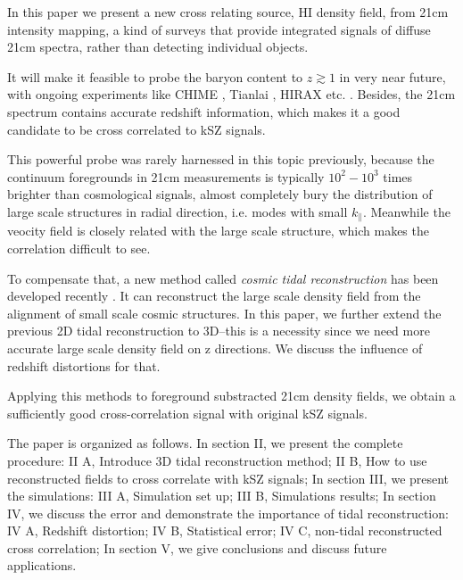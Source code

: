 In this paper we present a new cross relating source, HI density field, from 21cm intensity mapping, 
a kind of surveys that provide integrated signals of diffuse 21cm spectra, 
rather than detecting individual objects. 

It will make it feasible to probe the baryon content to $z\gtrsim1$ in very near future, with ongoing experiments like
CHIME \cite{2014SPIE.9145E..22B}, Tianlai \cite{2015ApJ...798...40X}, 
HIRAX \cite{HIRAX} etc.
.
Besides, the 21cm spectrum contains accurate redshift information, which makes it a good candidate to be cross correlated to kSZ signals.

This powerful probe was rarely harnessed in this topic previously, 
because the continuum foregrounds in 21cm measurements is typically $10^2 - 10^3$ times brighter than cosmological signals, almost completely bury the distribution of large scale structures in radial direction, i.e. modes with small $k_\parallel$.
Meanwhile the veocity field is closely related with the large scale structure, 
which makes the correlation difficult to see.

To compensate that, a new method called {\it cosmic tidal reconstruction} has been 
developed recently \cite{2012:pen}\cite{2015:zhu}. 
It can reconstruct the large scale density field from the alignment of small 
scale cosmic structures. 
In this paper, we further extend the previous 2D tidal reconstruction to 3D--this is a necessity since we need more accurate large scale density field on z directions. We discuss the influence of redshift distortions for that.

Applying this methods to foreground substracted 21cm density fields, we obtain a sufficiently good cross-correlation signal with original kSZ signals. 

The paper is organized as follows. 
In section II, we present the complete procedure: 
II A, Introduce 3D tidal reconstruction method; 
II B, How to use reconstructed fields to cross correlate
with kSZ signals; 
In section III, we present the simulations: 
III A, Simulation set up; 
III B, Simulations results;
In section IV, we discuss the error and demonstrate the importance of tidal reconstruction: 
IV A, Redshift distortion;
IV B, Statistical error;
IV C, non-tidal reconstructed cross correlation;
In section V, we give conclusions and discuss future applications.


